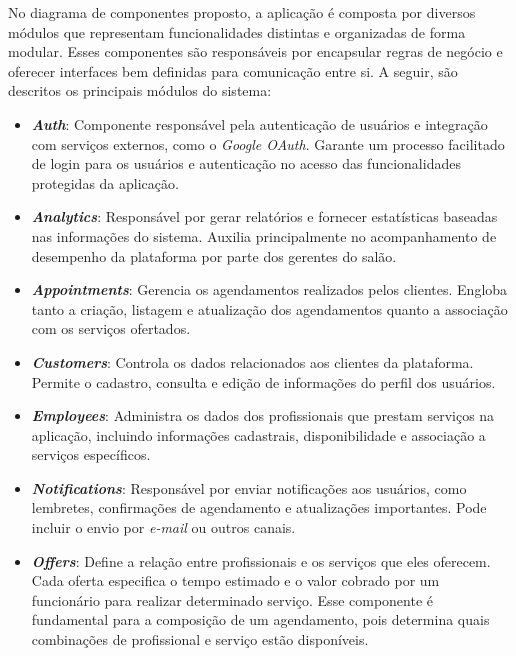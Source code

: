 No diagrama de componentes proposto, a aplicação é composta por diversos módulos que representam funcionalidades distintas e organizadas de forma modular. Esses componentes são responsáveis por encapsular regras de negócio e oferecer interfaces bem definidas para comunicação entre si. A seguir, são descritos os principais módulos do sistema:

\begin{itemize}
  \item \textbf{\emph{Auth}}: Componente responsável pela autenticação de usuários e integração com serviços externos, como o \emph{Google OAuth}. Garante um processo facilitado de login para os usuários e autenticação no acesso das funcionalidades protegidas da aplicação.

  \item \textbf{\emph{Analytics}}: Responsável por gerar relatórios e fornecer estatísticas baseadas nas informações do sistema. Auxilia principalmente no acompanhamento de desempenho da plataforma por parte dos gerentes do salão.

  \item \textbf{\emph{Appointments}}: Gerencia os agendamentos realizados pelos clientes. Engloba tanto a criação, listagem e atualização dos agendamentos quanto a associação com os serviços ofertados.

  \item \textbf{\emph{Customers}}: Controla os dados relacionados aos clientes da plataforma. Permite o cadastro, consulta e edição de informações do perfil dos usuários.

  \item \textbf{\emph{Employees}}: Administra os dados dos profissionais que prestam serviços na aplicação, incluindo informações cadastrais, disponibilidade e associação a serviços específicos.

  \item \textbf{\emph{Notifications}}: Responsável por enviar notificações aos usuários, como lembretes, confirmações de agendamento e atualizações importantes. Pode incluir o envio por \emph{e-mail} ou outros canais.

  \item \textbf{\emph{Offers}}: Define a relação entre profissionais e os serviços que eles oferecem. Cada oferta especifica o tempo estimado e o valor cobrado por um funcionário para realizar determinado serviço. Esse componente é fundamental para a composição de um agendamento, pois determina quais combinações de profissional e serviço estão disponíveis.


\end{itemize}
